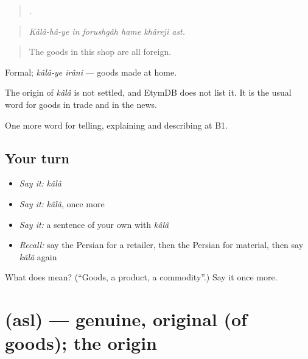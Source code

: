 \begin{quote}
     .
\end{quote}

\begin{quote}
\emph{Kâlâ-hâ-ye in forushgâh hame khâreji ast.}
\end{quote}

\begin{quote}
The goods in this shop are all foreign.
\end{quote}

Formal; \emph{kâlâ-ye irâni} — goods made at home.

\begin{cousinweb}
The origin of \emph{kâlâ} is not settled, and EtymDB does not list it. It is the usual word for goods in trade and in the news.
\end{cousinweb}

\begin{grammarlens}[title={What you've built}]
One more word for telling, explaining and describing at B1.
\end{grammarlens}

\subsection*{Your turn}
\begin{itemize}
\raggedright
  \item \emph{Say it:} \emph{kâlâ}
  \item \emph{Say it:} \emph{kâlâ}, once more
  \item \emph{Say it:} a sentence of your own with \emph{kâlâ}
  \item \emph{Recall:} say the Persian for a retailer, then the Persian for material, then say \emph{kâlâ} again
\end{itemize}

\begin{tcolorbox}[breakable,colback=teal!4,colframe=teal!35!black,title={Before you move on}]
What does  mean? (\textquotedblleft{}Goods, a product, a commodity\textquotedblright{}.) Say it once more.
\end{tcolorbox}
\section[\texorpdfstring{\fa{اصل} (asl)}{اصل (asl)}]{ (asl) — genuine, original (of goods); the origin}

